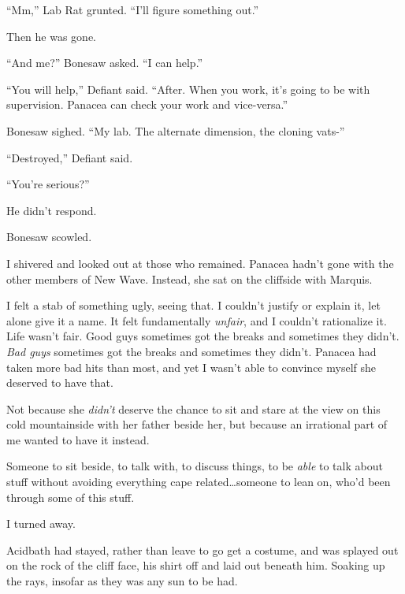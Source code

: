 ``Mm,'' Lab Rat grunted.  ``I'll figure something out.''



Then he was gone.



``And me?'' Bonesaw asked.  ``I can help.''



``You will help,'' Defiant said.  ``After.  When you work, it's going to be with supervision.  Panacea can check your work and vice-versa.''



Bonesaw sighed.  ``My lab.  The alternate dimension, the cloning vats-''



``Destroyed,'' Defiant said.



``You're serious?''



He didn't respond.



Bonesaw scowled.



I shivered and looked out at those who remained.  Panacea hadn't gone with the other members of New Wave.  Instead, she sat on the cliffside with Marquis.



I felt a stab of something ugly, seeing that.  I couldn't justify or explain it, let alone give it a name.  It felt fundamentally \emph{unfair}, and I couldn't rationalize it.  Life wasn't fair.  Good guys sometimes got the breaks and sometimes they didn't.  \emph{Bad guys} sometimes got the breaks and sometimes they didn't.  Panacea had taken more bad hits than most, and yet I wasn't able to convince myself she deserved to have that.



Not because she \emph{didn't} deserve the chance to sit and stare at the view on this cold mountainside with her father beside her, but because an irrational part of me wanted to have it instead.



Someone to sit beside, to talk with, to discuss things, to be \emph{able} to talk about stuff without avoiding everything cape related\ldots someone to lean on, who'd been through some of this stuff.



I turned away.



Acidbath had stayed, rather than leave to go get a costume, and was splayed out on the rock of the cliff face, his shirt off and laid out beneath him.  Soaking up the rays, insofar as they was any sun to be had.



